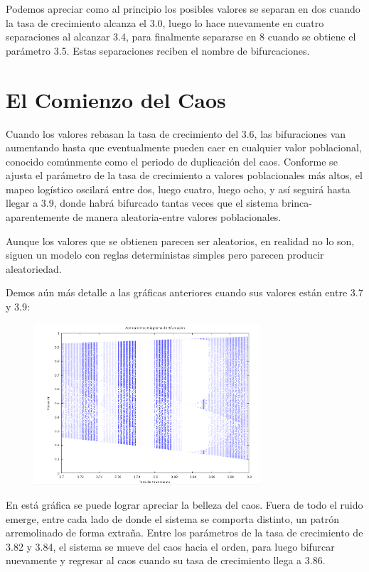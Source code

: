\documentclass{article}
\begin{document}
Podemos apreciar como al principio los posibles valores se separan en dos cuando la tasa de crecimiento alcanza el 3.0, luego lo hace nuevamente en cuatro separaciones al alcanzar 3.4, para finalmente separarse en 8 cuando se obtiene el parámetro 3.5. Estas separaciones reciben el nombre de bifurcaciones.

\section{El Comienzo del Caos}
Cuando los valores rebasan la tasa de crecimiento del 3.6, las bifuraciones van aumentando hasta que eventualmente pueden caer en cualquier valor poblacional, conocido comúnmente como el periodo de duplicación del caos. Conforme se ajusta el parámetro de la tasa de crecimiento a valores poblacionales más altos, el mapeo logístico oscilará entre dos, luego cuatro, luego ocho, y así seguirá hasta llegar a 3.9, donde habrá bifurcado tantas veces que el sistema brinca-aparentemente de manera aleatoria-entre valores poblacionales.

Aunque los valores que se obtienen parecen ser aleatorios, en realidad no lo son, siguen un modelo con reglas deterministas simples pero parecen producir aleatoriedad.

Demos aún más detalle a las gráficas anteriores cuando sus valores están entre 3.7 y 3.9:

	\begin{figure}[h!]
    \includegraphics[height=6cm]{graf4.png}
    \centering
    \end{figure}

En está gráfica se puede lograr apreciar la belleza del caos. Fuera de todo el ruido emerge, entre cada lado de donde el sistema se comporta distinto, un patrón arremolinado de forma extraña. Entre los parámetros de la tasa de crecimiento de 3.82 y 3.84, el sistema se mueve del caos hacia el orden, para luego bifurcar nuevamente y regresar al caos cuando su tasa de crecimiento llega a 3.86.
\end{document}
